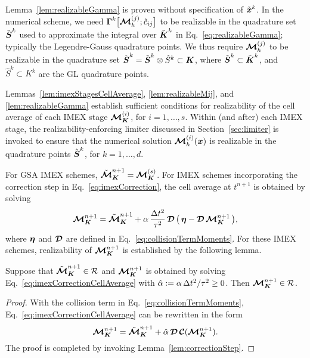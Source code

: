 \begin{rem}
  Lemma~\eqref{lem:realizableGamma} is proven without specification of $\tilde{\boldsymbol{x}}^{k}$.  
  In the numerical scheme, we need $\boldsymbol{\Gamma}^{k}\big[\boldsymbol{\mathcal{M}}_{h}^{(j)};\hat{c}_{ij}\big]$ to be realizable in the quadrature set $\tilde{\boldsymbol{S}}^{k}$ used to approximate the integral over $\tilde{\boldsymbol{K}}^{k}$ in Eq.~\eqref{eq:realizableGamma}; typically the Legendre-Gauss quadrature points.  
  We thus require $\boldsymbol{\mathcal{M}}_{h}^{(j)}$ to be realizable in the quadrature set $\hat{\boldsymbol{S}}^{k}=\tilde{\boldsymbol{S}}^{k}\otimes\hat{S}^{k}\subset\boldsymbol{K}$, where $\tilde{\boldsymbol{S}}^{k}\subset\tilde{\boldsymbol{K}}^{k}$, and $\hat{S}^{k}\subset K^{k}$ are the GL quadrature points.  
\end{rem}

\begin{rem}
  Lemmas~\ref{lem:imexStagesCellAverage}, \ref{lem:realizableMij}, and \ref{lem:realizableGamma} establish sufficient conditions for realizability of the cell average of each IMEX stage $\boldsymbol{\mathcal{M}}_{\boldsymbol{K}}^{(i)}$, for $i=1,\ldots,s$.  
  Within (and after) each IMEX stage, the realizability-enforcing limiter discussed in Section~\ref{sec:limiter} is invoked to ensure that the numerical solution $\boldsymbol{\mathcal{M}}_{h}^{(i)}(\boldsymbol{x})$ is realizable in the quadrature points $\hat{\boldsymbol{S}}^{k}$, for $k=1,\ldots,d$.  
\end{rem}

For GSA IMEX schemes, $\tilde{\boldsymbol{\mathcal{M}}}_{\boldsymbol{K}}^{n+1}=\boldsymbol{\mathcal{M}}_{\boldsymbol{K}}^{(s)}$.  
For IMEX schemes incorporating the correction step in Eq.~\eqref{eq:imexCorrection}, the cell average at $t^{n+1}$ is obtained by solving
\begin{equation}
  \boldsymbol{\mathcal{M}}_{\boldsymbol{K}}^{n+1}=\tilde{\boldsymbol{\mathcal{M}}}_{\boldsymbol{K}}^{n+1}+\alpha\,\frac{\Delta t^{2}}{\tau^{2}}\,\boldsymbol{\mathcal{D}}\,\big(\,\boldsymbol{\eta}-\boldsymbol{\mathcal{D}}\,\boldsymbol{\mathcal{M}}_{\boldsymbol{K}}^{n+1}\,\big),
  \label{eq:imexCorrectionCellAverage}
\end{equation}
where $\boldsymbol{\eta}$ and $\boldsymbol{\mathcal{D}}$ are defined in Eq.~\eqref{eq:collisionTermMoments}.  
For these IMEX schemes, realizability of $\boldsymbol{\mathcal{M}}_{\boldsymbol{K}}^{n+1}$ is established by the following lemma.  
\begin{lemma}
  Suppose that $\tilde{\boldsymbol{\mathcal{M}}}_{\boldsymbol{K}}^{n+1}\in\mathcal{R}$ and $\boldsymbol{\mathcal{M}}_{\boldsymbol{K}}^{n+1}$ is obtained by solving Eq.~\eqref{eq:imexCorrectionCellAverage} with $\hat{\alpha}:=\alpha\,\Delta t^{2}/\tau^{2}\ge0$.  
  Then $\boldsymbol{\mathcal{M}}_{\boldsymbol{K}}^{n+1}\in\mathcal{R}$.  
  \label{lem:imexCorrectionCellAverage}
\end{lemma}
\begin{proof}
  With the collision term in Eq.~\eqref{eq:collisionTermMoments}, Eq.~\eqref{eq:imexCorrectionCellAverage} can be rewritten in the form
  \begin{equation*}
    \boldsymbol{\mathcal{M}}_{\boldsymbol{K}}^{n+1}=\tilde{\boldsymbol{\mathcal{M}}}_{\boldsymbol{K}}^{n+1}+\hat{\alpha}\,\boldsymbol{\mathcal{D}}\,\boldsymbol{\mathcal{C}}(\boldsymbol{\mathcal{M}}_{\boldsymbol{K}}^{n+1}).  
  \end{equation*}
  The proof is completed by invoking Lemma~\ref{lem:correctionStep}.  
\end{proof}

